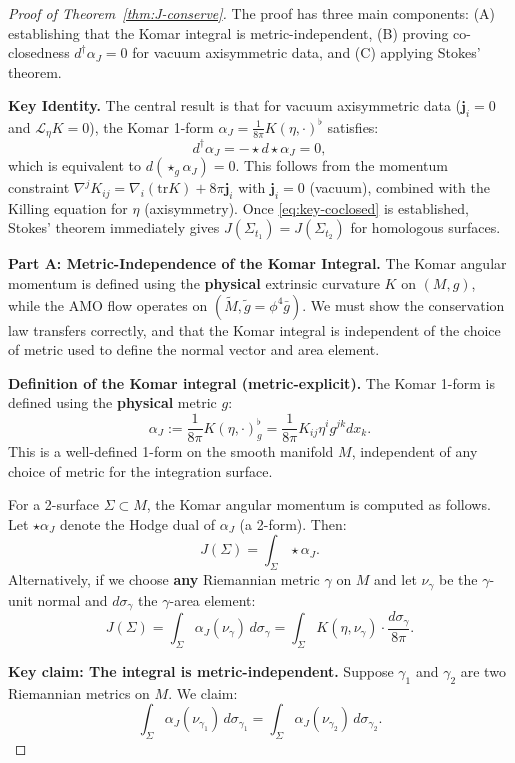 \documentclass[12pt]{article}
\theoremstyle{plain}
\theoremstyle{definition}
\theoremstyle{remark}
\newcommand{\tr}{\mathrm{tr}}
\newcommand{\tM}{\tilde{M}}
\newcommand{\tg}{\tilde{g}}
\newcommand{\bg}{\bar{g}}
\newcommand{\momdens}{\boldsymbol{j}}
\begin{document}
\begin{proof}[Proof of Theorem~\ref{thm:J-conserve}]
The proof has three main components: (A) establishing that the Komar integral is metric-independent, (B) proving co-closedness $d^\dagger\alpha_J = 0$ for vacuum axisymmetric data, and (C) applying Stokes' theorem.

\textbf{Key Identity.} The central result is that for vacuum axisymmetric data ($\momdens_i = 0$ and $\mathcal{L}_\eta K = 0$), the Komar 1-form $\alpha_J = \frac{1}{8\pi}K(\eta, \cdot)^\flat$ satisfies:
\begin{equation}\label{eq:key-coclosed}
d^\dagger \alpha_J = -\star d\star \alpha_J = 0,
\end{equation}
which is equivalent to $d(\star_g \alpha_J) = 0$. This follows from the momentum constraint $\nabla^j K_{ij} = \nabla_i(\tr K) + 8\pi \momdens_i$ with $\momdens_i = 0$ (vacuum), combined with the Killing equation for $\eta$ (axisymmetry). Once \eqref{eq:key-coclosed} is established, Stokes' theorem immediately gives $J(\Sigma_{t_1}) = J(\Sigma_{t_2})$ for homologous surfaces.

\textbf{Part A: Metric-Independence of the Komar Integral.}
The Komar angular momentum is defined using the \textbf{physical} extrinsic curvature $K$ on $(M, g)$, while the AMO flow operates on $(\tM, \tg = \phi^4 \bg)$. We must show the conservation law transfers correctly, and that the Komar integral is independent of the choice of metric used to define the normal vector and area element.

\textbf{Definition of the Komar integral (metric-explicit).} The Komar 1-form is defined using the \textbf{physical} metric $g$:
\[
\alpha_J := \frac{1}{8\pi} K(\eta, \cdot)^\flat_g = \frac{1}{8\pi} K_{ij} \eta^i g^{jk} dx_k.
\]
This is a well-defined 1-form on the smooth manifold $M$, independent of any choice of metric for the integration surface.

For a 2-surface $\Sigma \subset M$, the Komar angular momentum is computed as follows. Let $\star \alpha_J$ denote the Hodge dual of $\alpha_J$ (a 2-form). Then:
\[
J(\Sigma) = \int_\Sigma \star \alpha_J.
\]
Alternatively, if we choose \textbf{any} Riemannian metric $\gamma$ on $M$ and let $\nu_\gamma$ be the $\gamma$-unit normal and $d\sigma_\gamma$ the $\gamma$-area element:
\[
J(\Sigma) = \int_\Sigma \alpha_J(\nu_\gamma) \, d\sigma_\gamma = \int_\Sigma K(\eta, \nu_\gamma) \cdot \frac{d\sigma_\gamma}{8\pi}.
\]

\textbf{Key claim: The integral is metric-independent.} Suppose $\gamma_1$ and $\gamma_2$ are two Riemannian metrics on $M$. We claim:
\[
\int_\Sigma \alpha_J(\nu_{\gamma_1}) \, d\sigma_{\gamma_1} = \int_\Sigma \alpha_J(\nu_{\gamma_2}) \, d\sigma_{\gamma_2}.
\]


\end{proof}
\end{document}
